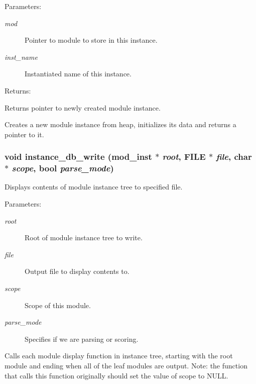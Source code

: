 \begin{Desc}
\item[Parameters: ]\par
\begin{description}
\item[{\em 
mod}]Pointer to module to store in this instance. \item[{\em 
inst\_\-name}]Instantiated name of this instance.\end{description}
\end{Desc}
\begin{Desc}
\item[Returns: ]\par
Returns pointer to newly created module instance.\end{Desc}
Creates a new module instance from heap, initializes its data and returns a pointer to it. 
\subsubsection{\setlength{\rightskip}{0pt plus 5cm}void instance\_\-db\_\-write ({\bf mod\_\-inst} $\ast$ {\em root}, FILE $\ast$ {\em file}, char $\ast$ {\em scope}, {\bf bool} {\em parse\_\-mode})}\label{instance_8c_a8}


Displays contents of module instance tree to specified file.

\begin{Desc}
\item[Parameters: ]\par
\begin{description}
\item[{\em 
root}]Root of module instance tree to write. \item[{\em 
file}]Output file to display contents to. \item[{\em 
scope}]Scope of this module. \item[{\em 
parse\_\-mode}]Specifies if we are parsing or scoring.\end{description}
\end{Desc}
Calls each module display function in instance tree, starting with the root module and ending when all of the leaf modules are output. Note: the function that calls this function originally should set the value of scope to NULL. 
